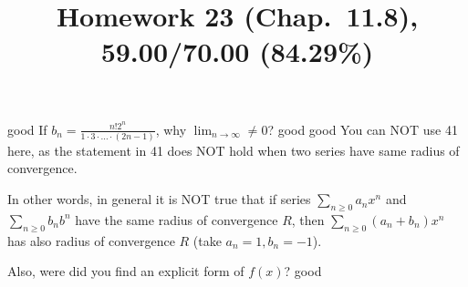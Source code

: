 \documentclass[10pt]{article} %
\title{Homework 23 (Chap.~11.8),
59.00/70.00 (84.29\%)
}
\begin{document}
\maketitle
{}
good
If $b_n=\frac{n!2^n}{1\cdot3\cdot\dots\cdot(2n-1)}$, why $\lim_{n\to\infty}\neq0$?
good
good
You can NOT use 41 here, as the statement in 41 does NOT hold when two series have same radius of convergence.

In other words, in general it is NOT true that if series $\sum_{n\ge0}a_nx^n$ and $\sum_{n\ge0}b_nb^n$ have
the same radius of convergence $R$, then $\sum_{n\ge0}(a_n+b_n)x^n$ has also radius of convergence $R$ (take $a_n=1, b_n=-1$).

Also, were did you find an explicit form of $f(x)$?
good
\end{document}
